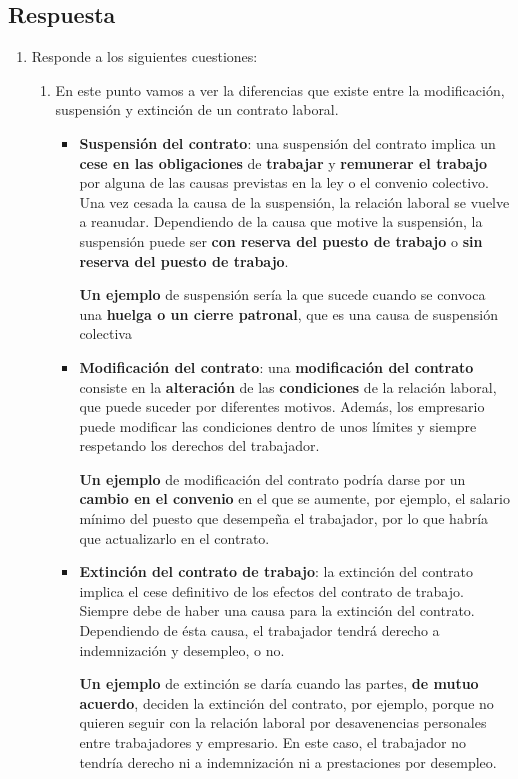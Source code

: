 \subsection{Respuesta}
\begin{enumerate}
    \item Responde a los siguientes cuestiones:
    \begin{enumerate}
    \item En este punto vamos a ver la diferencias que existe entre la modificación, suspensión y extinción de un contrato laboral.

        \begin{itemize}
            \item \textbf{Suspensión del contrato}: una suspensión del contrato implica un \textbf{cese en las obligaciones} de \textbf{trabajar} y \textbf{remunerar el trabajo} por alguna de las causas previstas en la ley o el convenio colectivo. Una vez cesada la causa de la suspensión, la relación laboral se vuelve a reanudar. Dependiendo de la causa que motive la suspensión, la suspensión puede ser \textbf{con reserva del puesto de trabajo} o \textbf{sin reserva del puesto de trabajo}.

            \textbf{Un ejemplo} de suspensión sería la que sucede cuando se convoca una \textbf{huelga o un cierre patronal}, que es una causa de suspensión colectiva

            \item \textbf{Modificación del contrato}: una \textbf{modificación del contrato} consiste en la \textbf{alteración} de las \textbf{condiciones} de la relación laboral, que puede suceder por diferentes motivos. Además, los empresario puede modificar las condiciones dentro de unos límites y siempre respetando los derechos del trabajador.

            \textbf{Un ejemplo} de modificación del contrato podría darse por un \textbf{cambio en el convenio} en el que se aumente, por ejemplo, el salario mínimo del puesto que desempeña el trabajador, por lo que habría que actualizarlo en el contrato.

            \item \textbf{Extinción del contrato de trabajo}: la extinción del contrato implica el cese definitivo de los efectos del contrato de trabajo. Siempre debe de haber una causa para la extinción del contrato. Dependiendo de ésta causa, el trabajador tendrá derecho a indemnización y desempleo, o no.

            \textbf{Un ejemplo} de extinción se daría cuando las partes, \textbf{de mutuo acuerdo}, deciden la extinción del contrato, por ejemplo, porque no quieren seguir con la relación laboral por desavenencias personales entre trabajadores y empresario. En este caso, el trabajador no tendría derecho ni a indemnización ni a prestaciones por desempleo.
        \end{itemize}


\end{enumerate}
\end{enumerate}
